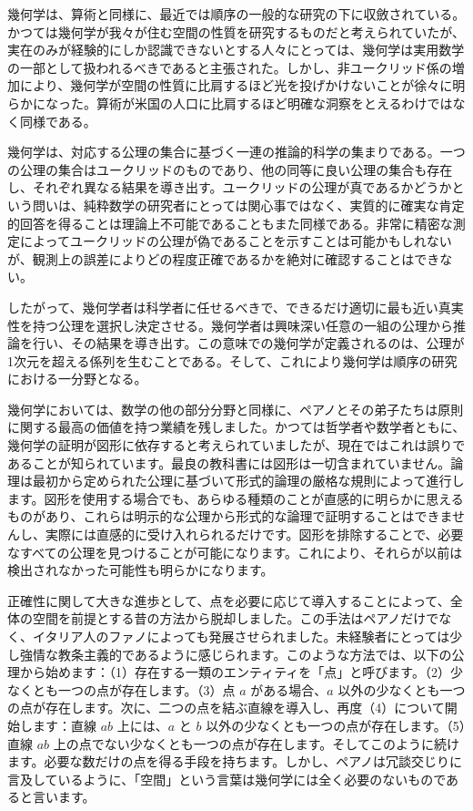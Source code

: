 \documentclass[a4paper,11pt,openany]{ltjsbook}
\begin{document}
幾何学は、算術と同様に、最近では順序の一般的な研究の下に収斂されている。かつては幾何学が我々が住む空間の性質を研究するものだと考えられていたが、実在のみが経験的にしか認識できないとする人々にとっては、幾何学は実用数学の一部として扱われるべきであると主張された。しかし、非ユークリッド係の増加により、幾何学が空間の性質に比肩するほど光を投げかけないことが徐々に明らかになった。算術が米国の人口に比肩するほど明確な洞察をとえるわけではなく同様である。

幾何学は、対応する公理の集合に基づく一連の推論的科学の集まりである。一つの公理の集合はユークリッドのものであり、他の同等に良い公理の集合も存在し、それぞれ異なる結果を導き出す。ユークリッドの公理が真であるかどうかという問いは、純粋数学の研究者にとっては関心事ではなく、実質的に確実な肯定的回答を得ることは理論上不可能であることもまた同様である。非常に精密な測定によってユークリッドの公理が偽であることを示すことは可能かもしれないが、観測上の誤差によりどの程度正確であるかを絶対に確認することはできない。

したがって、幾何学者は科学者に任せるべきで、できるだけ適切に最も近い真実性を持つ公理を選択し決定させる。幾何学者は興味深い任意の一組の公理から推論を行い、その結果を導き出す。この意味での幾何学が定義されるのは、公理が1次元を超える係列を生むことである。そして、これにより幾何学は順序の研究における一分野となる。

幾何学においては、数学の他の部分分野と同様に、ペアノとその弟子たちは原則に関する最高の価値を持つ業績を残しました。かつては哲学者や数学者ともに、幾何学の証明が図形に依存すると考えられていましたが、現在ではこれは誤りであることが知られています。最良の教科書には図形は一切含まれていません。論理は最初から定められた公理に基づいて形式的論理の厳格な規則によって進行します。図形を使用する場合でも、あらゆる種類のことが直感的に明らかに思えるものがあり、これらは明示的な公理から形式的な論理で証明することはできませんし、実際には直感的に受け入れられるだけです。図形を排除することで、必要なすべての公理を見つけることが可能になります。これにより、それらが以前は検出されなかった可能性も明らかになります。

正確性に関して大きな進歩として、点を必要に応じて導入することによって、全体の空間を前提とする昔の方法から脱却しました。この手法はペアノだけでなく、イタリア人のファノによっても発展させられました。未経験者にとっては少し強情な教条主義的であるように感じられます。このような方法では、以下の公理から始めます：（1）存在する一類のエンティティを「点」と呼びます。（2）少なくとも一つの点が存在します。（3）点 $a$ がある場合、$a$ 以外の少なくとも一つの点が存在します。次に、二つの点を結ぶ直線を導入し、再度（4）について開始します：直線 $ab$ 上には、$a$ と $b$ 以外の少なくとも一つの点が存在します。（5）直線 $ab$ 上の点でない少なくとも一つの点が存在します。そしてこのように続けます。必要な数だけの点を得る手段を持ちます。しかし、ペアノは冗談交じりに言及しているように、「空間」という言葉は幾何学には全く必要のないものであると言います。
\end{document}
